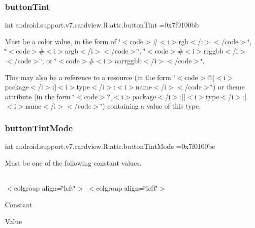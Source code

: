 \subsubsection{\texorpdfstring{button\+Tint}{buttonTint}}
{\footnotesize\ttfamily int android.\+support.\+v7.\+cardview.\+R.\+attr.\+button\+Tint =0x7f0100bb\hspace{0.3cm}{\ttfamily [static]}}

Must be a color value, in the form of \char`\"{}$<$code$>$\#$<$i$>$rgb$<$/i$>$$<$/code$>$\char`\"{}, \char`\"{}$<$code$>$\#$<$i$>$argb$<$/i$>$$<$/code$>$\char`\"{}, \char`\"{}$<$code$>$\#$<$i$>$rrggbb$<$/i$>$$<$/code$>$\char`\"{}, or \char`\"{}$<$code$>$\#$<$i$>$aarrggbb$<$/i$>$$<$/code$>$\char`\"{}. 

This may also be a reference to a resource (in the form \char`\"{}$<$code$>$@\mbox{[}$<$i$>$package$<$/i$>$\+:\mbox{]}$<$i$>$type$<$/i$>$\+:$<$i$>$name$<$/i$>$$<$/code$>$\char`\"{}) or theme attribute (in the form \char`\"{}$<$code$>$?\mbox{[}$<$i$>$package$<$/i$>$\+:\mbox{]}\mbox{[}$<$i$>$type$<$/i$>$\+:\mbox{]}$<$i$>$name$<$/i$>$$<$/code$>$\char`\"{}) containing a value of this type. \mbox{\label{classandroid_1_1support_1_1v7_1_1cardview_1_1R_1_1attr_afeaf294e11b1d7a013c71a69de1adf7b}} 
\subsubsection{\texorpdfstring{button\+Tint\+Mode}{buttonTintMode}}
{\footnotesize\ttfamily int android.\+support.\+v7.\+cardview.\+R.\+attr.\+button\+Tint\+Mode =0x7f0100bc\hspace{0.3cm}{\ttfamily [static]}}

Must be one of the following constant values.

\tabulinesep=1mm
\begin{longtabu} spread 0pt [c]{*{0}{|X[-1]}|}
\hline
\end{longtabu}
$<$colgroup align=\char`\"{}left\char`\"{}$>$ $<$colgroup align=\char`\"{}left\char`\"{}$>$ 

Constant

Value

